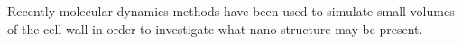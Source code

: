 Recently molecular dynamics methods have been used to simulate small volumes of
the cell wall in order to investigate what nano structure may be present.
